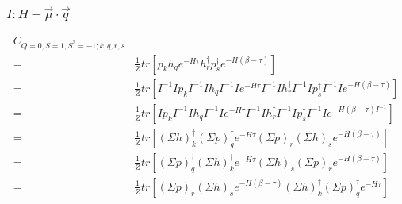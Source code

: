 \subsubsection{\underline{$I : H - \vec{\mu}\cdot\vec{q}$}}

\begin{equation*}
  \begin{aligned}
    C_{Q=0,S=1,S^3=-1;k,q,r,s} \\
    =& \frac{1}{Z}tr\left[p_kh_qe^{-H\tau}h^\dagger_rp^\dagger_se^{-H\left(\beta-\tau\right)}\right] \\
    =& \frac{1}{Z}tr\left[I^{-1}Ip_kI^{-1}Ih_qI^{-1}Ie^{-H\tau}I^{-1}Ih^\dagger_rI^{-1}Ip^\dagger_sI^{-1}Ie^{-H\left(\beta-\tau\right)}\right] \\
    =& \frac{1}{Z}tr\left[Ip_kI^{-1}Ih_qI^{-1}Ie^{-H\tau}I^{-1}Ih^\dagger_rI^{-1}Ip^\dagger_sI^{-1}Ie^{-H\left(\beta-\tau\right)I^{-1}}\right] \\
    =& \frac{1}{Z}tr\left[(\Sigma h)^\dagger_k(\Sigma p)^\dagger_qe^{-H\tau}(\Sigma p)_r(\Sigma h)_se^{-H\left(\beta-\tau\right)}\right] \\
    =& \frac{1}{Z}tr\left[(\Sigma p)^\dagger_q(\Sigma h)^\dagger_ke^{-H\tau}(\Sigma h)_s(\Sigma p)_re^{-H\left(\beta-\tau\right)}\right] \\
    =& \frac{1}{Z}tr\left[(\Sigma p)_r(\Sigma h)_se^{-H\left(\beta-\tau\right)}(\Sigma h)^\dagger_k(\Sigma p)^\dagger_qe^{-H\tau}\right]
  \end{aligned}
\end{equation*}

\renewcommand{\cor}[4]{p_{#1}h_{#2}h^\dagger_{#3}p^\dagger_{#4}}
\newcommand{\dscor}[4]{\left(\Sigma h\right)_{#1}^\dagger \left(\Sigma p\right)_{#2}^\dagger \left(\Sigma p\right)_{#3}\left(\Sigma h\right)_{#4}}
\renewcommand{\dcor}[4]{h_{#1}^\dagger p_{#2}^\dagger p_{#3} h_{#4}}

